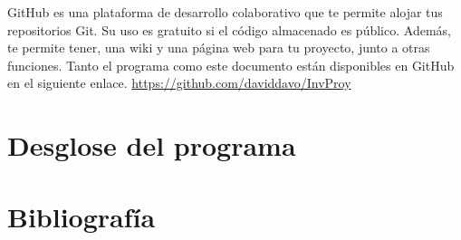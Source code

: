 \documentclass[a4paper]{article}
\begin{document}
GitHub es una plataforma de desarrollo colaborativo que te permite alojar tus repositorios Git. Su uso es gratuito si el código almacenado es público. Además, te permite tener, una wiki y una página web para tu proyecto, junto a otras funciones.
Tanto el programa como este documento están disponibles en GitHub en el siguiente enlace. \url{https://github.com/daviddavo/InvProy}

\section{Desglose del programa}

\newpage{}
\section{Bibliografía}
\printbibliography
\end{document}
